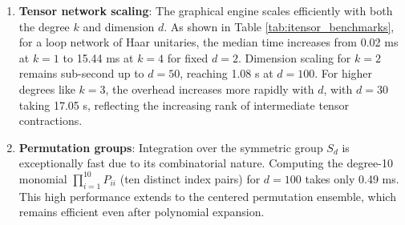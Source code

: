 \documentclass[manuscript,screen]{acmart}
\begin{document}
\begin{enumerate}
    unitary group, completes in approximately 9.81 ms, demonstrating the
    tool's applicability to quantum information tasks.
    \item \textbf{Tensor network scaling}: The graphical engine scales
    efficiently with both the degree $k$ and dimension $d$. As shown in Table
    \ref{tab:itensor_benchmarks}, for a loop network of Haar unitaries, the
    median time increases from 0.02 ms at $k=1$ to 15.44 ms at $k=4$ for
    fixed $d=2$. Dimension scaling for $k=2$ remains sub-second up to $d=50$,
    reaching 1.08 s at $d=100$. For higher degrees like $k=3$, the overhead
    increases more rapidly with $d$, with $d=30$ taking 17.05 s, reflecting the
    increasing rank of intermediate tensor contractions.
    \item \textbf{Permutation groups}: Integration over the symmetric group
    $S_d$ is exceptionally fast due to its combinatorial nature. Computing the
    degree-10 monomial $\prod_{i=1}^{10} P_{ii}$ (ten distinct index pairs) for
    $d=100$ takes only 0.49 ms. This
    high performance extends to the centered permutation ensemble, which remains
    efficient even after polynomial expansion.
\end{enumerate}
\end{document}

